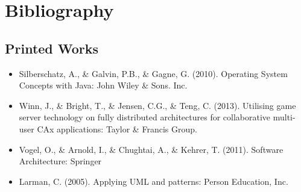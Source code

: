 \section{Bibliography}

\subsection{Printed Works}
\begin{itemize}
	\item Silberschatz, A., \& Galvin, P.B., \& Gagne, G. (2010).
   Operating System Concepts with Java: John Wiley \& Sons. Inc.
 	\item Winn, J., \& Bright, T., \& Jensen, C.G., \& Teng, C. (2013). Utilising game server technology on fully distributed architectures for collaborative multi-user CAx applications: Taylor \& Francis Group.
 	\item Vogel, O., \& Arnold, I., \& Chughtai, A., \& Kehrer, T. (2011). Software Architecture: Springer
 	\item Larman, C. (2005). Applying UML and patterns: Person Education, Inc.
\end{itemize}

